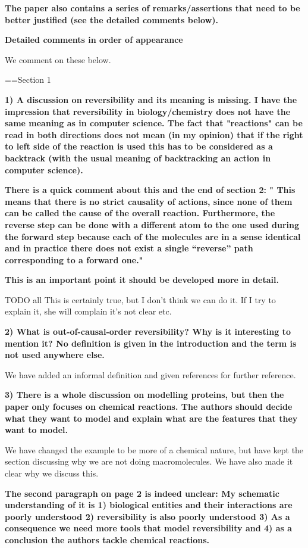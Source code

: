 \documentclass{article}
\begin{document}
\textbf{The paper also contains a series of remarks/assertions that need to be better justified (see the detailed comments below).}

\textbf{Detailed comments in order of appearance}

We comment on these below.

==Section 1

\textbf{1) A discussion on reversibility and its meaning is missing. 
I have the impression that reversibility in biology/chemistry does not have the same meaning as in computer science. The fact that "reactions" can be read in both directions does not mean (in my opinion) that if the right to left side of the reaction is used this has to be considered as a backtrack (with the usual meaning of backtracking an action in computer science).}

\textbf{There is a quick comment about this and the end of section 2: " This means that there is no strict causality of actions, since none of them can be called the cause of the overall reaction. Furthermore, the reverse step can be done with a different atom to the one used during the forward step because each of the molecules are in a sense identical and in practice there does not exist a single “reverse” path corresponding to a forward one."}

\textbf{This is an important point it should be developed more in detail. }

TODO all This is certainly true, but I don't think we can do it. If I try to explain it, she will complain it's not clear etc. 

\textbf{2) What is out-of-causal-order reversibility? Why is it interesting to mention it? No definition is given in the introduction and the term is not used anywhere else.}

We have added an informal definition and given references for further reference.

\textbf{3) There is a whole discussion on modelling proteins, but then the paper only focuses on chemical reactions. 
The authors should decide what they want to model and explain what are the features that they want to model.}

We have changed the example to be more of a chemical nature, but have kept the section discussing why we are not doing macromolecules. We have also made it clear why we discuss this.

\textbf{The second paragraph on page 2 is indeed unclear:
My schematic understanding of it is 1) biological entities and their interactions are poorly understood 2) reversibility is also poorly understood 3) As a consequence we need more tools that model reversibility and 4) as a conclusion the authors tackle chemical reactions.}
\end{document}

